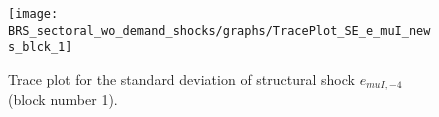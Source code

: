 \begin{figure}[H]
\centering
  \texttt{[image: BRS\_sectoral\_wo\_demand\_shocks/graphs/TracePlot\_SE\_e\_muI\_news\_blck\_1]}\\
    \caption{Trace plot for the standard deviation of structural shock ${e_{muI,-4}}$ (block number 1).}
\end{figure}
